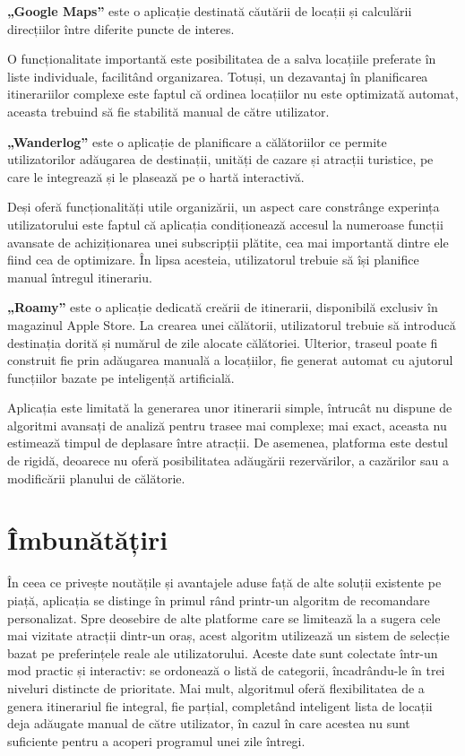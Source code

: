 \textbf{„Google Maps”} este o aplicație destinată căutării de locații și calculării direcțiilor între diferite puncte de interes. 

O funcționalitate importantă este posibilitatea de a salva locațiile preferate în liste individuale, facilitând organizarea. Totuși, un dezavantaj în planificarea itinerariilor complexe este faptul că ordinea locațiilor nu este optimizată automat, aceasta trebuind să fie stabilită manual de către utilizator.

\textbf{„Wanderlog”} este o aplicație de planificare a călătoriilor ce permite utilizatorilor adăugarea de destinații, unități de cazare și atracții turistice, pe care le integrează și le plasează pe o hartă interactivă. 

Deși oferă funcționalități utile organizării, un aspect care constrânge experința utilizatorului este faptul că aplicația condiționează accesul la numeroase funcții avansate de achiziționarea unei subscripții plătite,  cea mai importantă dintre ele fiind cea de optimizare. În lipsa acesteia, utilizatorul trebuie să își planifice manual întregul itinerariu.

\textbf{„Roamy”} este o aplicație dedicată creării de itinerarii, disponibilă exclusiv în magazinul Apple Store. La crearea unei călătorii, utilizatorul trebuie să introducă destinația dorită și numărul de zile alocate călătoriei. Ulterior, traseul poate fi construit fie prin adăugarea manuală a locațiilor, fie generat automat cu ajutorul funcțiilor bazate pe inteligență artificială.

Aplicația este limitată la generarea unor itinerarii simple, întrucât nu dispune de algoritmi avansați de analiză pentru trasee mai complexe; mai exact, aceasta nu estimează timpul de deplasare între atracții. De asemenea, platforma este destul de rigidă, deoarece nu oferă posibilitatea adăugării rezervărilor, a cazărilor sau a modificării planului de călătorie.

\section{Îmbunătățiri}

În ceea ce privește noutățile și avantajele aduse față de alte soluții existente pe piață, aplicația se distinge în primul rând printr-un algoritm de recomandare personalizat. Spre deosebire de alte platforme care se limitează la a sugera cele mai vizitate atracții dintr-un oraș, acest algoritm utilizează un sistem de selecție bazat pe preferințele reale ale utilizatorului. Aceste date sunt colectate într-un mod practic și interactiv: se ordonează o listă de categorii, încadrându-le în trei niveluri distincte de prioritate. Mai mult, algoritmul oferă flexibilitatea de a genera itinerariul fie integral, fie parțial, completând inteligent lista de locații deja adăugate manual de către utilizator, în cazul în care acestea nu sunt suficiente pentru a acoperi programul unei zile întregi.

